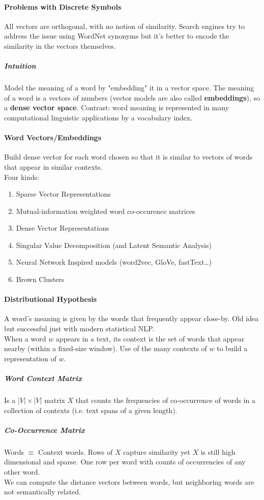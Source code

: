 \documentclass[10pt]{report}
\begin{document}
\paragraph{Problems with Discrete Symbols} All vectors are orthogonal, with no notion of similarity. Search engines try to address the issue using WordNet synonyms but it's better to encode the similarity in the vectors themselves.
\subparagraph{Intuition} Model the meaning of a word by "embedding" it in a vector space. The meaning of a word is a vectors of numbers (vector models are also called \textbf{embeddings}), so a \textbf{dense vector space}. Contrast: word meaning is represented in many computational linguistic applications by a vocabulary index.
\paragraph{Word Vectors/Embeddings} Build dense vector for each word chosen so that it is similar to vectors of words that appear in similar contexts.\\
Four kinds:\begin{enumerate}
	\item[] Sparse Vector Representations
	\item Mutual-information weighted word co-occurence matrices
	\item[] Dense Vector Representations
	\item Singular Value Decomposition (and Latent Semantic Analysis)
	\item Neural Network Inspired models (word2vec, GloVe, fastText\ldots)
	\item Brown Clusters
\end{enumerate}
\paragraph{Distributional Hypothesis} A word's meaning is given by the words that frequently appear close-by. Old idea but successful just with modern statistical NLP.\\
When a word $w$ appears in a text, its context is the set of words that appear nearby (within a fixed-size window). Use of the many contexts of $w$ to build a representation of $w$.
\subparagraph{Word Context Matrix} Is a $|V|\times|V|$ matrix $X$ that counts the frequencies of co-occurrence of words in a collection of contexts (i.e. text spans of a given length).
\subparagraph{Co-Occurrence Matrix} Words $\equiv$ Context words. Rows of $X$ capture similarity yet $X$ is still high dimensional and sparse. One row per word with counts of occurrencies of any other word.\\
We can compute the distance vectors between words, but neighboring words are not semantically related.
\end{document}
